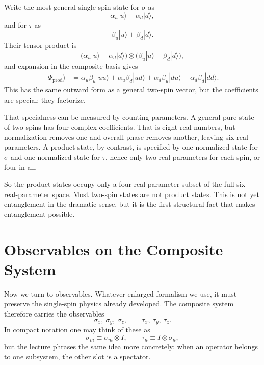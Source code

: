 Write the most general single-spin state for \(\sigma\) as
\[
\alpha_u|u\rangle+\alpha_d|d\rangle,
\]
and for \(\tau\) as
\[
\beta_u|u\rangle+\beta_d|d\rangle.
\]
Their tensor product is
\begin{equation}
\bigl(\alpha_u|u\rangle+\alpha_d|d\rangle\bigr)\otimes
\bigl(\beta_u|u\rangle+\beta_d|d\rangle\bigr),
\end{equation}
and expansion in the composite basis gives
\begin{align}
|\Psi_{\mathrm{prod}}\rangle
&=
\alpha_u\beta_u|uu\rangle
+\alpha_u\beta_d|ud\rangle
+\alpha_d\beta_u|du\rangle
+\alpha_d\beta_d|dd\rangle.
\end{align}
This has the same outward form as a general two-spin vector, but the coefficients are special: they factorize.

That specialness can be measured by counting parameters. A general pure state of two spins has four complex coefficients. That is eight real numbers, but normalization removes one and overall phase removes another, leaving six real parameters. A product state, by contrast, is specified by one normalized state for \(\sigma\) and one normalized state for \(\tau\), hence only two real parameters for each spin, or four in all.

So the product states occupy only a four-real-parameter subset of the full six-real-parameter space. Most two-spin states are not product states. This is not yet entanglement in the dramatic sense, but it is the first structural fact that makes entanglement possible.

\section{Observables on the Composite System}

Now we turn to observables. Whatever enlarged formalism we use, it must preserve the single-spin physics already developed. The composite system therefore carries the observables
\[
\sigma_x,\ \sigma_y,\ \sigma_z,
\qquad
\tau_x,\ \tau_y,\ \tau_z.
\]
In compact notation one may think of these as
\[
\sigma_m \equiv \sigma_m\otimes I,
\qquad
\tau_n \equiv I\otimes \sigma_n,
\]
but the lecture phrases the same idea more concretely: when an operator belongs to one subsystem, the other slot is a spectator.

